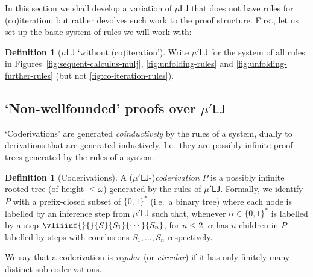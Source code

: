 \documentclass[10pt,a4paper]{amsart}
\theoremstyle{plain}
\theoremstyle{definition}
\newtheorem{definition}[definition]{Definition}
\newtheorem{defn}[defn]{Definition}
\newtheorem{remark}[remark]{Remark}
\newcommand{\anupam}[1]{\todo[color=green]{A: #1}}
\renewcommand{\todo}[1]{}
\renewcommand{\anupam}[1]{}
\theoremstyle{plain}
\theoremstyle{definition} %
\newcommand{\LJ}{\mathsf{LJ}}
\newcommand{\muLJ}{\mu\LJ}
\newcommand{\muLJnorec}{\mu'\LJ}
\newcommand{\der}{P}
\begin{document}
In this section we shall develop a variation of $\muLJ$ that does not have rules for (co)iteration, but rather devolves such work to the proof structure.
First, let us set up the basic system of rules we will work with:
\begin{definition}
[$\muLJ$ `without (co)iteration']
Write $\muLJnorec$ for the system of all rules in Figures~\ref{fig:sequent-calculus-mulj}, \ref{fig:unfolding-rules} and \ref{fig:unfolding-further-rules} (but not \ref{fig:co-iteration-rules}).
\end{definition}


\subsection{`Non-wellfounded' proofs over $\muLJnorec$}

`Coderivations' are generated \emph{coinductively} by the rules of a system, dually to derivations that are generated inductively.
I.e.\ they are possibly infinite proof trees generated by the rules of a system.


\begin{defn}
[Coderivations]
A ($\muLJnorec$-)\emph{coderivation} $\der$ is a possibly infinite {rooted} tree (of height $\leq \omega$) generated by the rules of $\muLJnorec$.
Formally, we identify $\der$ with a prefix-closed subset of $ \{0,1\}^*$ (i.e.\ a binary tree) where each node  is labelled by an inference step from $\muLJnorec$ such that, whenever $\alpha\in \{0,1\}^*$ is labelled by a step $\vliiinf{}{}{S}{S_1}{\cdots}{S_n}$, for $n\leq 2$, $\alpha$ has $n$ children in $\der$ labelled by steps with conclusions $S_1, \dots, S_n$ respectively. 

We say that a coderivation is \emph{regular} (or \emph{circular}) if it has only finitely many distinct sub-coderivations.
\end{defn}
\end{document}
